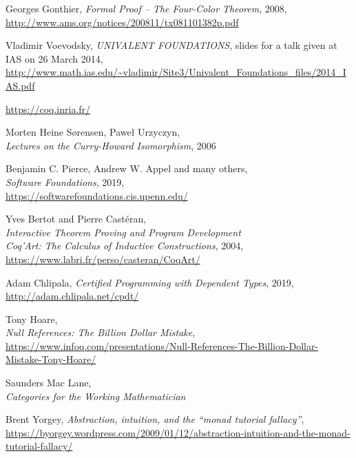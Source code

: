 \documentclass[declaration,inz,english,shortabstract]{iithesis}
\begin{document}
\begin{thebibliography}{1}
        Georges Gonthier,
        \textit{Formal Proof -- The Four-Color Theorem}, 2008, \\
        \url{http://www.ams.org/notices/200811/tx081101382p.pdf}

        Vladimir Voevodsky,
        \textit{UNIVALENT FOUNDATIONS},
        slides for a talk given at IAS on 26 March 2014, \\
        \url{http://www.math.ias.edu/~vladimir/Site3/Univalent_Foundations_files/2014_IAS.pdf}

        \url{https://coq.inria.fr/}

        Morten Heine Sørensen, Paweł Urzyczyn, \\
        \textit{Lectures on the Curry-Howard Isomorphism}, 2006
    
        Benjamin C. Pierce, Andrew W. Appel and many others, \\
        \textit{Software Foundations}, 2019, \\
        \url{https://softwarefoundations.cis.upenn.edu/}
    
        Yves Bertot and Pierre Castéran, \\
        \textit{Interactive Theorem Proving and Program Development \\ Coq'Art: The Calculus of Inductive Constructions}, 2004, \\
        \url{https://www.labri.fr/perso/casteran/CoqArt/}

        Adam Chlipala,
        \textit{Certified Programming with Dependent Types}, 2019,
        \url{http://adam.chlipala.net/cpdt/}

        Tony Hoare, \\
        \textit{Null References: The Billion Dollar Mistake}, \\
        \url{https://www.infoq.com/presentations/Null-References-The-Billion-Dollar-Mistake-Tony-Hoare/}
    
        Saunders Mac Lane, \\
        \textit{Categories for the Working Mathematician}

        Brent Yorgey, \textit{Abstraction, intuition, and the ``monad tutorial fallacy''}, \\
        \url{https://byorgey.wordpress.com/2009/01/12/abstraction-intuition-and-the-monad-tutorial-fallacy/}


\end{thebibliography}
\end{document}

